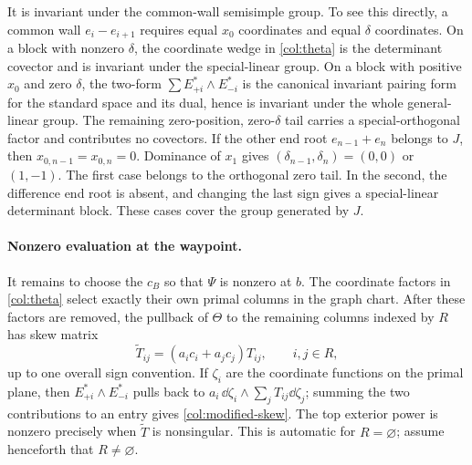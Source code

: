 It is invariant under the common-wall semisimple group.  To see this
directly, a common wall $e_i-e_{i+1}$ requires equal $x_0$ coordinates
and equal $\delta$ coordinates.  On a block with nonzero $\delta$,
the coordinate wedge in \eqref{col:theta} is the determinant
covector and is invariant under the special-linear group.  On a block
with positive $x_0$ and zero $\delta$, the two-form
$\sum E_{+i}^*\wedge E_{-i}^*$ is the canonical invariant pairing
form for the standard space and its dual, hence is invariant under
the whole general-linear group.  The remaining zero-position,
zero-$\delta$ tail carries a special-orthogonal factor and contributes
no covectors.  If the other end root $e_{n-1}+e_n$ belongs to $J$, then
$x_{0,n-1}=x_{0,n}=0$.  Dominance of $x_1$ gives
$(\delta_{n-1},\delta_n)=(0,0)$ or $(1,-1)$.  The first case belongs
to the orthogonal zero tail.  In the second, the difference end root
is absent, and changing the last sign gives a special-linear
determinant block.  These cases cover the group generated by $J$.

\paragraph{Nonzero evaluation at the waypoint.}
It remains to choose the $c_B$ so that $\Psi$ is nonzero at $b$.
The coordinate factors in \eqref{col:theta} select exactly their own
primal columns in the graph chart.  After these factors are removed,
the pullback of $\Theta$ to the remaining columns indexed by $R$ has
skew matrix
\begin{equation}\label{col:modified-skew}
 \widetilde T_{ij}=(a_i c_i+a_j c_j)T_{ij},\qquad i,j\in R,
\end{equation}
up to one overall sign convention.  If $\zeta_i$ are the coordinate
functions on the primal plane, then
$E_{+i}^*\wedge E_{-i}^*$ pulls back to
$a_i\,\dd\zeta_i\wedge\sum_jT_{ij}\dd\zeta_j$;
summing the two contributions to an entry gives
\eqref{col:modified-skew}.  The top exterior power is nonzero
precisely when $\widetilde T$ is nonsingular.  This is automatic for
$R=\varnothing$; assume henceforth that $R\ne\varnothing$.

